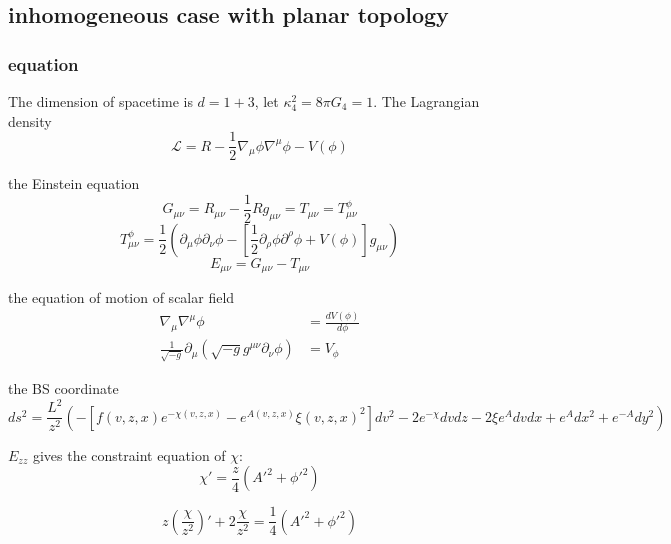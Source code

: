 \documentclass[12pt,a4paper]{ctexart}
\numberwithin{equation}{section}
\begin{document}
\subsection{inhomogeneous case with planar topology}

\subsubsection{equation}

The dimension of spacetime is $d=1+3$, let $\kappa_4^2=8\pi G_4=1$. The Lagrangian density
\begin{equation}
    \mathcal{L}=R-\frac{1}{2}\nabla_\mu\phi\nabla^\mu\phi-V(\phi)
\end{equation}

the Einstein equation
\begin{equation}
    G_{\mu\nu}=R_{\mu\nu}-\frac{1}{2}Rg_{\mu\nu}=T_{\mu\nu}=T_{\mu\nu}^\phi
\end{equation}
\begin{equation}
    T_{\mu\nu}^\phi=\frac{1}{2}(\partial_\mu\phi\partial_\nu\phi-[\frac{1}{2}\partial_\rho\phi\partial^\rho\phi+V(\phi)]g_{\mu\nu})
\end{equation}
\begin{equation}
    E_{\mu\nu}=G_{\mu\nu}-T_{\mu\nu}
\end{equation}

the equation of motion of scalar field
\begin{equation}
    \begin{aligned}
        \nabla_\mu\nabla^\mu\phi&=\frac{dV(\phi)}{d\phi}\\
        \frac{1}{\sqrt{-g}}\partial_\mu(\sqrt{-g}g^{\mu\nu}\partial_\nu\phi)&=V_\phi
    \end{aligned}
\end{equation}

the BS coordinate
\begin{equation}
    ds^2=\frac{L^2}{z^2}(-[f(v,z,x)e^{-\chi(v,z,x)}-e^{A(v,z,x)}\xi(v,z,x)^2]dv^2-2e^{-\chi}dvdz-2\xi e^Advdx+e^Adx^2+e^{-A}dy^2)
\end{equation}

$E_{zz}$ gives the constraint equation of $\chi$:
\begin{equation}
    \chi'=\frac{z}{4}(A'^2+\phi'^2)
\end{equation}

\begin{equation}
    z\left(\frac{\chi}{z^2}\right)'+2\frac{\chi}{z^2}=\frac{1}{4}(A'^2+\phi'^2)
\end{equation}
\end{document}
